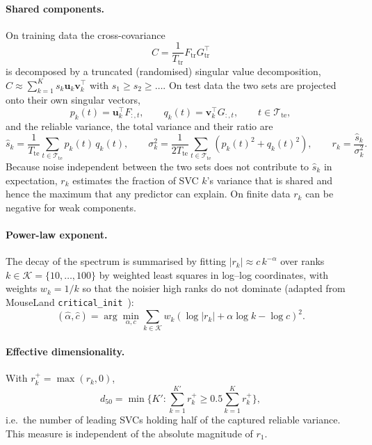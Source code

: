 \documentclass[11pt]{article}
\begin{document}
\paragraph{Shared components.} On training data the cross-covariance
\begin{equation}
  C = \frac{1}{T_{\mathrm{tr}}} F_{\mathrm{tr}} G_{\mathrm{tr}}^{\top}
\end{equation}
is decomposed by a truncated (randomised) singular value decomposition, $C \approx \sum_{k=1}^{K} s_k \mathbf{u}_k \mathbf{v}_k^{\top}$ with $s_1 \ge s_2 \ge \dots$. On test data the two sets are projected onto their own singular vectors,
\begin{equation}
  p_k(t) = \mathbf{u}_k^{\top} F_{:,t}, \qquad q_k(t) = \mathbf{v}_k^{\top} G_{:,t}, \qquad t \in \mathcal{T}_{\mathrm{te}},
\end{equation}
and the reliable variance, the total variance and their ratio are
\begin{equation}
  \hat{s}_k = \frac{1}{T_{\mathrm{te}}} \sum_{t \in \mathcal{T}_{\mathrm{te}}} p_k(t)\, q_k(t), \qquad
  \sigma_k^2 = \frac{1}{2 T_{\mathrm{te}}} \sum_{t \in \mathcal{T}_{\mathrm{te}}} \left( p_k(t)^2 + q_k(t)^2 \right), \qquad
  r_k = \frac{\hat{s}_k}{\sigma_k^2}.
\end{equation}
Because noise independent between the two sets does not contribute to $\hat{s}_k$ in expectation, $r_k$ estimates the fraction of SVC $k$'s variance that is shared and hence the maximum that any predictor can explain. On finite data $r_k$ can be negative for weak components.

\paragraph{Power-law exponent.} The decay of the spectrum is summarised by fitting $|r_k| \approx c\, k^{-\alpha}$ over ranks $k \in \mathcal{K} = \{10, \dots, 100\}$ by weighted least squares in log--log coordinates, with weights $w_k = 1/k$ so that the noisier high ranks do not dominate (adapted from MouseLand \texttt{critical\_init}~\cite{criticalinit}):
\begin{equation}
  (\hat{\alpha}, \hat{c}) = \arg\min_{\alpha, c} \sum_{k \in \mathcal{K}} w_k \left( \log |r_k| + \alpha \log k - \log c \right)^2 .
\end{equation}

\paragraph{Effective dimensionality.} With $r_k^{+} = \max(r_k, 0)$,
\begin{equation}
  d_{50} = \min \Big\{ K' : \textstyle\sum_{k=1}^{K'} r_k^{+} \ge 0.5 \sum_{k=1}^{K} r_k^{+} \Big\},
\end{equation}
i.e.\ the number of leading SVCs holding half of the captured reliable variance. This measure is independent of the absolute magnitude of $r_1$.
\end{document}
